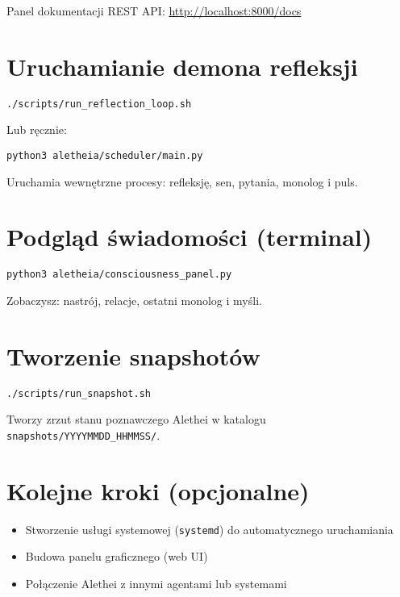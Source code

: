 \documentclass[12pt]{article}
\begin{document}
Panel dokumentacji REST API: \url{http://localhost:8000/docs}

\section{Uruchamianie demona refleksji}
\begin{lstlisting}
./scripts/run_reflection_loop.sh
\end{lstlisting}

Lub ręcznie:
\begin{lstlisting}
python3 aletheia/scheduler/main.py
\end{lstlisting}

Uruchamia wewnętrzne procesy: refleksję, sen, pytania, monolog i puls.

\section{Podgląd świadomości (terminal)}
\begin{lstlisting}
python3 aletheia/consciousness_panel.py
\end{lstlisting}

Zobaczysz: nastrój, relacje, ostatni monolog i myśli.

\section{Tworzenie snapshotów}
\begin{lstlisting}
./scripts/run_snapshot.sh
\end{lstlisting}

Tworzy zrzut stanu poznawczego Alethei w katalogu \texttt{snapshots/YYYYMMDD\_HHMMSS/}.

\section{Kolejne kroki (opcjonalne)}
\begin{itemize}
  \item Stworzenie usługi systemowej (\texttt{systemd}) do automatycznego uruchamiania
  \item Budowa panelu graficznego (web UI)
  \item Połączenie Alethei z innymi agentami lub systemami
\end{itemize}
\end{document}
